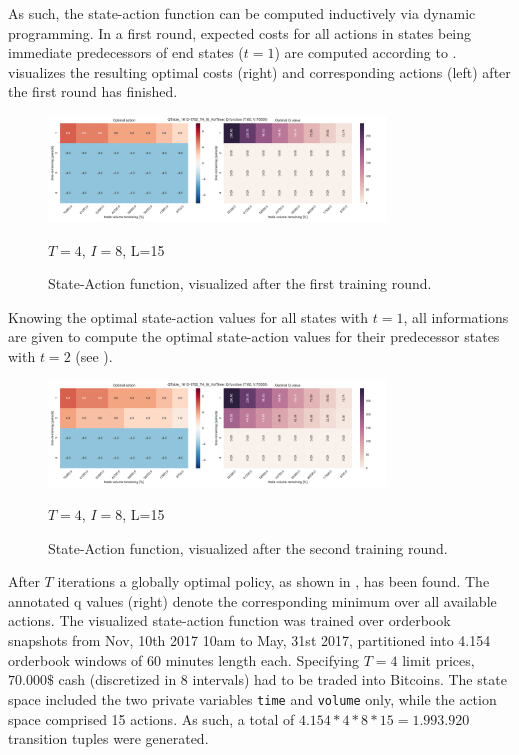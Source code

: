 As such, the state-action function can be computed inductively via dynamic programming. In a first round, expected costs for all actions in states being immediate predecessors of end states (\ie $t=1$) are computed according to .  visualizes the resulting optimal costs (right) and corresponding actions (left) after the first round has finished.

\begin{figure}[ht]
	\centering
   \includegraphics[width=0.8\textwidth]{content/drawings/heatmap_3months_t1}
	\caption{State-Action function, visualized after the first training round.}
	$T=4$, $I=8$, L=15
	\label{fig:heatmap:t1}
\end{figure}

Knowing the optimal state-action values for all states with $t=1$, all informations are given to compute the optimal state-action values for their predecessor states with $t=2$ (see ).

\begin{figure}[ht]
	\centering
   \includegraphics[width=0.8\textwidth]{content/drawings/heatmap_3months_t2}
	\caption{State-Action function, visualized after the second training round.}
	$T=4$, $I=8$, L=15
	\label{fig:heatmap:t2}
\end{figure}

After $T$ iterations a globally optimal policy, as shown in , has been found. The annotated q values (right) denote the corresponding minimum over all available actions. The visualized state-action function was trained over orderbook snapshots from Nov, 10th 2017 10am to May, 31st 2017, partitioned into 4.154 orderbook windows of 60 minutes length each. Specifying $T=4$ limit prices, $70.000\$$ cash (discretized in 8 intervals) had to be traded into Bitcoins. The state space included the two private variables \lstinline!time! and \lstinline!volume! only, while the action space comprised 15 actions. As such, a total of $4.154 * 4 * 8 * 15 = 1.993.920$ transition tuples were generated.

